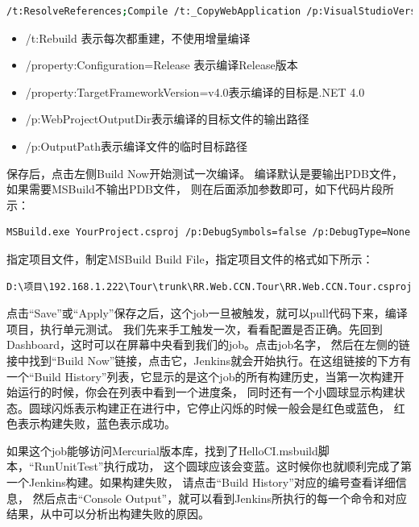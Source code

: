 \documentclass{book}
\begin{document}
\begin{lstlisting}[language=Bash]
/t:ResolveReferences;Compile /t:_CopyWebApplication /p:VisualStudioVersion=12.0 /p:Configuration=Release /property:TargetFrameworkVersion=v4.0 /p:WebProjectOutputDir=E:\Web\RR.Web.CCN.Tour\1.0.1 /p:OutputPath=E:\JenkinsPublish\Bin
\end{lstlisting}

\begin{itemize}
\item{/t:Rebuild 表示每次都重建，不使用增量编译}
\item{/property:Configuration=Release 表示编译Release版本}
\item{/property:TargetFrameworkVersion=v4.0表示编译的目标是.NET 4.0}
\item{/p:WebProjectOutputDir表示编译的目标文件的输出路径}
\item{/p:OutputPath表示编译文件的临时目标路径}
\end{itemize}

保存后，点击左侧Build Now开始测试一次编译。
编译默认是要输出PDB文件，如果需要MSBuild不输出PDB文件，
则在后面添加参数即可，如下代码片段所示：

\begin{lstlisting}[language=Bash]
MSBuild.exe YourProject.csproj /p:DebugSymbols=false /p:DebugType=None
\end{lstlisting}

指定项目文件，制定MSBuild Build File，指定项目文件的格式如下所示：

\begin{lstlisting}
D:\项目\192.168.1.222\Tour\trunk\RR.Web.CCN.Tour\RR.Web.CCN.Tour.csproj
\end{lstlisting}

点击“Save”或“Apply”保存之后，这个job一旦被触发，就可以pull代码下来，编译项目，执行单元测试。
我们先来手工触发一次，看看配置是否正确。先回到Dashboard，这时可以在屏幕中央看到我们的job。点击job名字，
然后在左侧的链接中找到“Build Now”链接，点击它，Jenkins就会开始执行。在这组链接的下方有一个“Build History”列表，它显示的是这个job的所有构建历史，当第一次构建开始运行的时候，你会在列表中看到一个进度条，
同时还有一个小圆球显示构建状态。圆球闪烁表示构建正在进行中，它停止闪烁的时候一般会是红色或蓝色，
红色表示构建失败，蓝色表示成功。

如果这个job能够访问Mercurial版本库，找到了HelloCI.msbuild脚本，“RunUnitTest”执行成功，
这个圆球应该会变蓝。这时候你也就顺利完成了第一个Jenkins构建。如果构建失败，
请点击“Build History”对应的编号查看详细信息，
然后点击“Console Output”，就可以看到Jenkins所执行的每一个命令和对应结果，从中可以分析出构建失败的原因。
\end{document}
